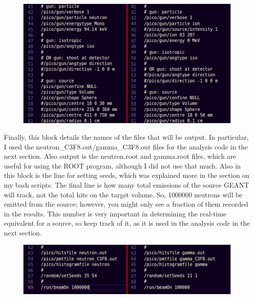 \documentclass[%
12pt,
twoside,
reprint,
amsmath,amssymb,
aps,
]{article}
\begin{document}
	\begin{figure}[!h]
		\centering
		\includegraphics[scale = 1]{Images/properties.png}
		\caption{\label{tab:table-name}}
	\end{figure}

	\noindent Finally, this block details the names of the files that will be output. In particular, I used the neutron\_C3F8.out/gamma\_C3F8.out files for the analysis code in the next section. Also output is the neutron.root and gamma.root files, which are useful for using the ROOT program, although I did not use that much. Also in this block is the line for setting seeds, which was explained more in the section on my bash scripts. The final line is how many total emissions of the source GEANT will track, not the total hits on the target volume. So, 1000000 neutrons will be emitted from the source; however, you might only see a fraction of them recorded in the results. This number is very important in determining the real-time equivalent for a source, so keep track of it, as it is used in the analysis code in the next section.
	
	\begin{figure}[!h]
		\centering
		\includegraphics[scale = 1]{Images/output.png}
		\caption{\label{tab:table-name}}
	\end{figure}
	
\end{document}
